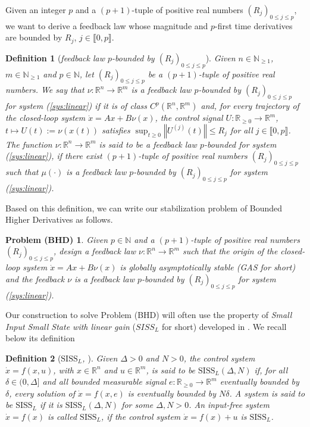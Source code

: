\documentclass[letterpaper, 10pt]{article}
\newtheorem{defi}{Definition}
\newtheorem*{pb}{Problem (BHD)}
\newcommand{\rref}[1]{(\ref{#1})}
\newcommand{\norme}[1]{\left\Vert #1\right\Vert}
\newcommand{\reels}{\mathbb{R}}
\newcommand{\siss}{\text{SISS}}
\begin{document}
Given an integer $p$ and a $(p+1)$-tuple of positive real numbers $(R_j)_{0 \leq j \leq p}$, we want to derive a feedback law whose magnitude and $p$-first time derivatives are bounded by $R_j$, $j\in \llbracket 0 , p \rrbracket$.
\begin{defi}[\emph{feedback law $p$-bounded by $(R_j)_{0 \leq j \leq p}$}]
Given $n\in\mathbb N_{\geq 1}$, $m\in\mathbb N_{\geq 1}$ and $p\in\mathbb N$, let $(R_j)_{0 \leq j \leq p}$ be a $(p+1)$-tuple of positive real numbers. We say that $\nu : \reels^n \rightarrow \reels^m $ is a \emph{feedback law $p$-bounded by $(R_j)_{0 \leq j \leq p}$  for system \rref{sys:linear}} if it is of class $C^p(\reels^n,\reels^m)$ and, for every trajectory of the closed-loop system $\dot{x}= A x +B \nu(x)$, the control signal $U : \reels_{\geq 0} \rightarrow  \reels^m $, $t\mapsto U(t) := \nu (x(t)) $ satisfies $\sup_{t\geq 0} \norme{ U^{(j)}(t)}  \leq R_j $ for all $j \in \llbracket 0 , p \rrbracket$. The function $\nu : \reels^n \rightarrow \reels^m $ is said to be a feedback law $p$-bounded for system \rref{sys:linear}, if there exist $(p+1)$-tuple of positive real numbers $(R_j)_{0 \leq j \leq p}$ such that $\mu(\cdot)$ is a feedback law $p$-bounded by $(R_j)_{0 \leq j \leq p}$  for system \rref{sys:linear}.
\end{defi}

Based on this definition, we can write our stabilization problem of Bounded Higher Derivatives as follows.
\begin{pb}
Given $p\in\mathbb N$ and a $(p+1)$-tuple of positive real numbers $(R_j)_{0 \leq j \leq p}$, design a feedback law $\nu : \reels^n \rightarrow \reels^m$ such that the origin of the closed-loop system $\dot{x}=  A x +B \nu(x)$ is globally asymptotically stable (GAS for short) and the feedback $\nu$ is a feedback law $p$-bounded by $(R_j)_{0 \leq j \leq p}$ for system \rref{sys:linear}.
\end{pb}

Our construction to solve Problem (BHD) will often use the property of \textit{Small Input Small State with linear gain} ($SISS_L$ for short) developed in \cite{SSY}. We recall below its definition



\begin{defi}[\emph{$\siss_L$, \cite{SSY}}]
Given $\Delta>0$ and $N>0$, the control system $\dot{x}=f(x,u)$, with $x\in \reels^n$ and $u\in \reels^m$, is said to be \emph{$\siss_L(\Delta,N)$} if, for all $\delta \in (0, \Delta]$ and all bounded measurable signal $e: \reels_{\geq 0} \rightarrow \reels^m$  eventually bounded by $\delta$, every solution of $\dot{x}=f(x,e)$ is eventually bounded by $N \delta$.
A system is said to be \emph{$\siss_L$} if it is $\siss_L(\Delta , N)$ for some $\Delta,N > 0$. An input-free system $\dot{x}=f(x)$ is called $\siss_L$, if the control system $\dot{x}=f(x)+u$ is $\siss_L$. 
\end{defi}
 
\end{document}

